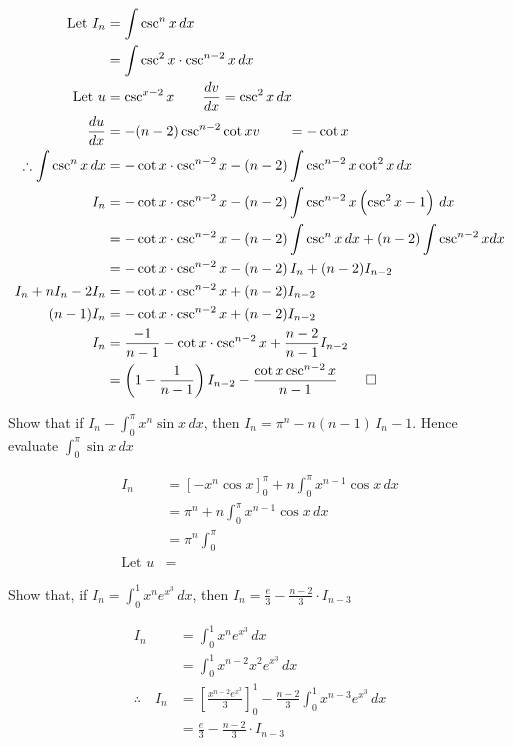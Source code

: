 \documentclass{standalone}
\begin{document}
	\begin{align*}
		\text{Let } I_n &= \int \csc^nx \, dx\\
		&= \int \csc^2x \cdot \csc^{n-2}x \, dx\\
		\text{Let } u & = \csc^{x-2} x              \qquad \frac{dv}{dx} = \csc^2x \, dx \\
		\frac{du}{dx}     & = -(n-2)\csc^{n-2}\cot x  v \qquad = -\cot x                 \\
		\therefore \int \csc^nx \, dx &= -\cot x \cdot \csc^{n-2}x  - (n-2)\int \csc^{n-2}x\cot^2x \, dx\\
		I_n &= 	-\cot x \cdot \csc^{n-2}x - (n-2)\int \csc^{n-2}x\left(\csc^2x - 1\right) \, dx\\
		&= 		-\cot x \cdot \csc^{n-2}x - (n-2)\int \csc^{n}x\,dx + (n-2)\int\csc^{n-2}xdx\\
		&=-\cot x \cdot \csc^{n-2}x  - (n-2)\, I_n + (n-2)I_{n-2}\\
		I_n + nI_n -2I_n &= -\cot x\cdot \csc^{n-2}x  + (n-2)I_{n-2}\\
		(n-1)I_n &= -\cot x\cdot \csc^{n-2}x  + (n-2)I_{n-2}\\
		I_n &= \frac{-1}{n-1}-\cot x\cdot \csc^{n-2}x + \frac{n-2}{n-1}I_{n-2}\\
		&= \left(1-\frac{1}{n-1}\right)I_{n-2}-\frac{\cot x\csc^{n-2}x}{n-1}\qed
	\end{align*}
	\begin{example}
		Show that if $I_n - \int_0^\pi x^n\sin x\,dx$, then $I_n = \pi^n - n(n-1)\,I_n-1$. Hence evaluate $\int_0^\pi\sin x\,dx$
	\end{example}
	\begin{align*}
		I_n &=\left[-x^n\cos x\right]_0^\pi + n\int_0^\pi x^{n-1} \cos x \, dx\\
		&=\pi^n + n\int_0^\pi x^{n-1} \cos x \, dx\\
		&= \pi^n \int_0^\pi \\
		\text {Let } u &=
	\end{align*}
	\begin{example}
		Show that, if $I_n = \int_0^1 x^n e^{x^3} \, dx$, then $I_n =\frac{e}{3} - \frac{n-2}{3} \cdot I_{n-3}$
	\end{example}
	
	\begin{align*}
		I_n &= \int_0^1 x^n e^{x^3} \, dx\\
		&= \int_0^1 x^{n-2}x^2e^{x^3} \, dx\\
		\therefore \quad I_n &= \left[\frac{x^{n-2}e^{x^3}}3\right]_0^1 - \frac{n-2}3 \int_0^1 x^{n-3}{e^{x^3}} \, dx\\
		&= \frac{e}3 - \frac{n-2}3 \cdot I_{n-3}
	\end{align*}
	
\end{document}
